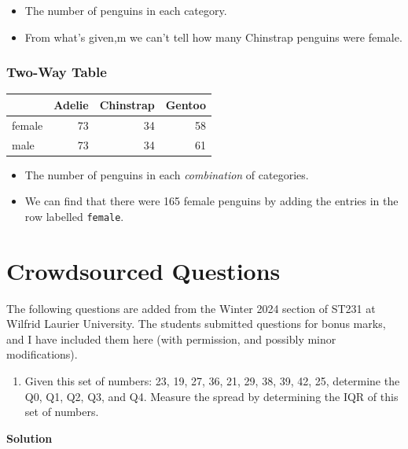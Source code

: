 \documentclass[
  letterpaper,
  DIV=11,
  numbers=noendperiod,
  oneside]{scrreprt}
\providecommand{\tightlist}{%
  \setlength{\itemsep}{0pt}\setlength{\parskip}{0pt}}\usepackage{longtable,booktabs,array}
\begin{document}
\begin{itemize}
\tightlist
\item
  The number of penguins in each category.
\item
  From what's given,m we can't tell how many Chinstrap penguins were
  female.
\end{itemize}

\hypertarget{two-way-table}{%
\subsubsection{Two-Way Table}\label{two-way-table}}

\begin{longtable}[]{@{}lrrr@{}}
\toprule\noalign{}
& Adelie & Chinstrap & Gentoo \\
\midrule\noalign{}
\endhead
\bottomrule\noalign{}
\endlastfoot
female & 73 & 34 & 58 \\
male & 73 & 34 & 61 \\
\end{longtable}

\begin{itemize}
\tightlist
\item
  The number of penguins in each \emph{combination} of categories.
\item
  We can find that there were 165 female penguins by adding the entries
  in the row labelled \texttt{female}.
\end{itemize}

\hypertarget{crowdsourced-questions-1}{%
\section{Crowdsourced Questions}\label{crowdsourced-questions-1}}

The following questions are added from the Winter 2024 section of ST231
at Wilfrid Laurier University. The students submitted questions for
bonus marks, and I have included them here (with permission, and
possibly minor modifications).

\begin{enumerate}
\def\labelenumi{\arabic{enumi}.}
\tightlist
\item
  Given this set of numbers: 23, 19, 27, 36, 21, 29, 38, 39, 42, 25,
  determine the Q0, Q1, Q2, Q3, and Q4. Measure the spread by
  determining the IQR of this set of numbers.
\end{enumerate}

\textbf{Solution}
\end{document}
